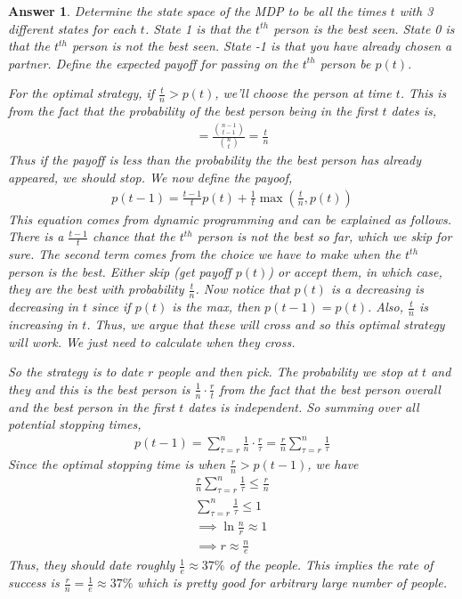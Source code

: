 \documentclass[12pt]{article}
\theoremstyle{colon}
\newtheorem*{answer}{Answer}
\begin{document}
\begin{answer}
  Determine the state space of the MDP to be all the times $t$ with 3 different states for each $t$. State 1 is that the $t^{th}$ person is the best seen. State 0 is that the $t^{th}$ person is not the best seen. State -1 is that you have already chosen a partner. Define the expected payoff for passing on the $t^{th}$ person be $p(t)$.

  For the optimal strategy, if $\frac{t}{n} > p(t)$, we'll choose the person at time $t$. This is from the fact that the probability of the best person being in the first $t$ dates is,
  \begin{gather*}
    = \frac{\binom{n-1}{t-1}}{\binom{n}{t}} = \frac{t}{n}
  \end{gather*}
  Thus if the payoff is less than the probability the the best person has already appeared, we should stop.
  We now define the payoof,
  \begin{gather*}
    p(t-1) = \frac{t-1}{t} p(t) + \frac{1}{t} \max(\frac{t}{n}, p(t))
  \end{gather*}
  This equation comes from dynamic programming and can be explained as follows. There is a $\frac{t-1}{t}$ chance that the $t^{th}$ person is not the best so far, which we skip for sure. The second term comes from the choice we have to make when the $t^{th}$ person is the best. Either skip (get payoff $p(t)$) or accept them, in which case, they are the best with probability $\frac{t}{n}$. Now notice that $p(t)$ is a decreasing is decreasing in $t$ since if $p(t)$ is the max, then $p(t-1) = p(t)$. Also, $\frac{t}{n}$ is increasing in $t$. Thus, we argue that these will cross and so this optimal strategy will work. We just need to calculate when they cross.

  So the strategy is to date $r$ people and then pick. The probability we stop at $t$ and they and this is the best person is $\frac{1}{n} \cdot \frac{r}{t}$ from the fact that the best person overall and the best person in the first $t$ dates is independent. So summing over all potential stopping times,
  \begin{gather*}
    p(t-1) = \sum_{\tau = r}^n \frac{1}{n} \cdot \frac{r}{\tau} = \frac{r}{n} \sum_{\tau = r}^n \frac{1}{\tau}
  \end{gather*}
  Since the optimal stopping time is when $\frac{r}{n} > p(t-1)$, we have
  \begin{gather*}
    \frac{r}{n} \sum_{\tau = r}^n \frac{1}{\tau} \leq \frac{r}{n} \\
    \sum_{\tau = r}^n \frac{1}{\tau} \leq 1 \\
    \implies \ln \frac{n}{r} \approx 1 \\
    \implies r \approx \frac{n}{e}
  \end{gather*}
  Thus, they should date roughly $\frac{1}{e} \approx 37\%$ of the people. This implies the rate of success is $\frac{r}{n} = \frac{1}{e} \approx 37\%$ which is pretty good for arbitrary large number of people.
\end{answer}
\end{document}
